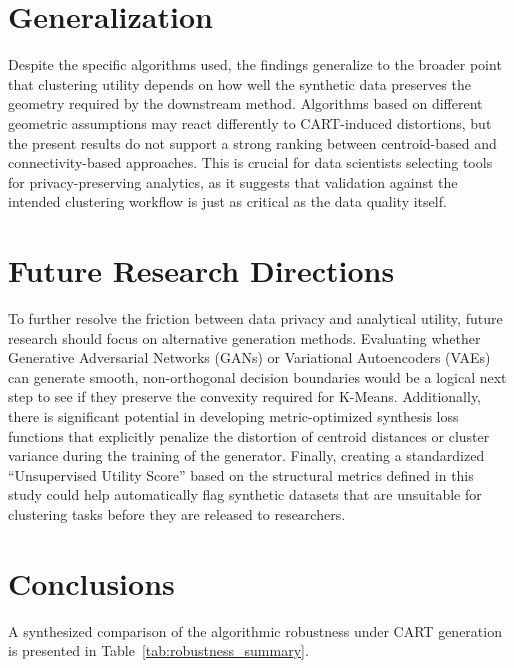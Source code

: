 \section{Generalization}
\label{sec:generalization-conclusions}

Despite the specific algorithms used, the findings generalize to the broader point that clustering utility depends on how well the synthetic data preserves the geometry required by the downstream method. Algorithms based on different geometric assumptions may react differently to CART-induced distortions, but the present results do not support a strong ranking between centroid-based and connectivity-based approaches. This is crucial for data scientists selecting tools for privacy-preserving analytics, as it suggests that validation against the intended clustering workflow is just as critical as the data quality itself.

\section{Future Research Directions}
\label{sec:future-research}

To further resolve the friction between data privacy and analytical utility, future research should focus on alternative generation methods. Evaluating whether Generative Adversarial Networks (GANs) or Variational Autoencoders (VAEs) can generate smooth, non-orthogonal decision boundaries would be a logical next step to see if they preserve the convexity required for K-Means. Additionally, there is significant potential in developing metric-optimized synthesis loss functions that explicitly penalize the distortion of centroid distances or cluster variance during the training of the generator. Finally, creating a standardized ``Unsupervised Utility Score'' based on the structural metrics defined in this study could help automatically flag synthetic datasets that are unsuitable for clustering tasks before they are released to researchers.

\section{Conclusions}
\label{sec:final-conclusions}

A synthesized comparison of the algorithmic robustness under CART generation is presented in Table~\ref{tab:robustness_summary}.

